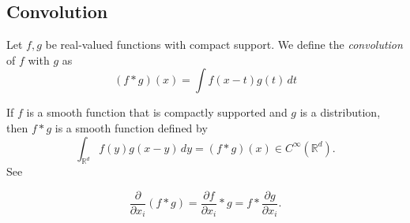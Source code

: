 \documentclass[../main.tex]{subfiles}
\begin{document}
\subsection{Convolution}
\begin{definition}
	Let $f,g$ be real-valued functions with compact support. We define the \emph{convolution} of $f$ with $g$ as $$(f\ast g)(x)=\int f(x-t)g(t) \, dt$$
\end{definition}


\begin{propo}
	If $f$ is a smooth function that is compactly supported and $g$ is a distribution, then $f\ast g$ is a smooth function defined by
	$${\displaystyle \int _{\mathbb {R} ^{d}}{f}(y)g(x-y)\,dy=(f*g)(x)\in C^{\infty }(\mathbb {R} ^{d}).} $$
	See \cite{adams2003sobolev}
	 \label{prop:29}
\end{propo}
\begin{propo} \label{prop:2}
	$${\frac {\partial }{\partial x_{i}}}(f*g)={\frac {\partial f}{\partial x_{i}}}*g=f*{\frac {\partial g}{\partial x_{i}}}.$$
\end{propo}
\end{document}
